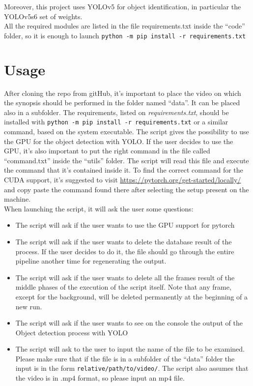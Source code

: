\documentclass[conference]{IEEEtran}
\begin{document}
		Moreover, this project uses YOLOv5 for object identification, in particular the YOLOv5s6 set of weights.\\
		All the required modules are listed in the file requirements.txt inside the ``code'' folder, so it is enough to launch
		\texttt{python -m pip install -r requirements.txt}
		
	\section{Usage}
	
		After cloning the repo from gitHub, it's important to place the video on which the synopsis should be performed 
		in the folder named ``data''. It can be placed also in a subfolder. The requirements, listed on \textit{requirements.txt}, 
		should be installed with \texttt{python -m pip install -r requirements.txt} or a similar command, based on the system 
		executable. The script gives the possibility to use the GPU for the object detection with YOLO. If the user decides to 
		use the GPU, it's also important to put the right command in the file called ``command.txt'' inside the ``utils'' folder. 
		The script will read this file and execute the command that it's contained inside it. To find the correct command for the 
		CUDA support, it's suggested to visit \url{https://pytorch.org/get-started/locally/} and copy paste the command found there 
		after selecting the setup present on the machine.\\
		When launching the script, it will ask the user some questions: 
		\begin{itemize}
		
			\item The script will ask if the user wants to use the GPU support for pytorch
			\item The script will ask if the user wants to delete the database result of the process. If the user decides to do it, the 
				file should go through the entire pipeline another time for regenerating the output.
			\item The script will ask if the user wants to delete all the frames result of the middle phases of the execution of the script 
				itself. Note that any frame, except for the background, will be deleted permanently at the beginning of a new run.
			\item The script will ask if the user wants to see on the console the output of the Object detection process with YOLO
			\item The script will ask to the user to input the name of the file to be examined. Please make sure that if the file is in a 
			subfolder of the ``data'' folder the input is in the form \texttt{relative/path/to/video/}. The script also assumes that 
			the video is in .mp4 format, so please input an mp4 file.
		
		\end{itemize}
		
\end{document}
